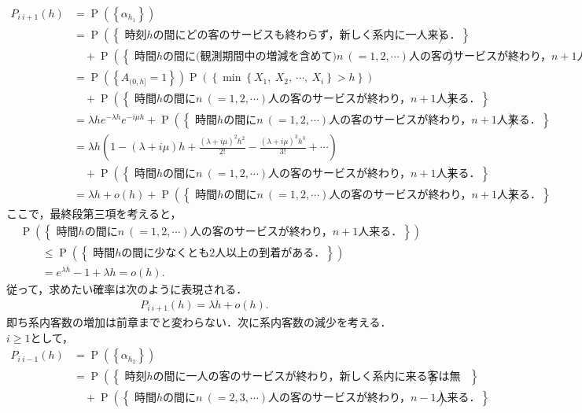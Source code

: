 \documentclass[a4j,papersize,disablejfam,slide,14pt]{jsarticle}
\def\min#1#2{\operatorname{min} \left\{ #1,\ #2 \right\}} %
\def\exp#1{e^{#1}} %
\def\prob#1{\operatorname{P} \left(\left\{ #1 \right\}\right)} %
\begin{document}
    \begin{align}
    	P_{i\ i+1}(h) &= \prob{\alpha_h_1} \\
        	&= \prob{\mbox{ 時刻$h$の間にどの客のサービスも終わらず，新しく系内に一人来る．}} \\
            &\quad+ \prob{\mbox{ 時間$h$の間に(観測期間中の増減を含めて)$n\ (=1,2,\cdots)$人の客のサービスが終わり，$n+1$人来る．}} \\
            &= \prob{A_{(0,h]} = 1} \prob{\min{X_1,\ X_2,\ \cdots}{X_i} > h} \\
            &\quad+ \prob{\mbox{ 時間$h$の間に$n\ (=1,2,\cdots)$人の客のサービスが終わり，$n+1$人来る．}} \\
            &= \lambda h \exp{-\lambda h} \exp{-i \mu h} + \prob{\mbox{ 時間$h$の間に$n\ (=1,2,\cdots)$人の客のサービスが終わり，$n+1$人来る．}} \\
            &= \lambda h \left( 1 - (\lambda+i\mu)h + \frac{(\lambda+i\mu)^2h^2}{2!} - \frac{(\lambda+i\mu)^3h^3}{3!} + \cdots \right) \\
            &\quad+ \prob{\mbox{ 時間$h$の間に$n\ (=1,2,\cdots)$人の客のサービスが終わり，$n+1$人来る．}} \\
            &= \lambda h + o(h) + \prob{\mbox{ 時間$h$の間に$n\ (=1,2,\cdots)$人の客のサービスが終わり，$n+1$人来る．}}.
    \end{align}
    ここで，最終段第三項を考えると，
    \begin{align}
    		&\prob{\mbox{ 時間$h$の間に$n\ (=1,2,\cdots)$人の客のサービスが終わり，$n+1$人来る．}} \\
            &\qquad\leq \prob{\mbox{ 時間$h$の間に少なくとも$2$人以上の到着がある．}} \\
        	&\qquad= \exp{\lambda h} - 1 + \lambda h = o(h). 
    \end{align}
    従って，求めたい確率は次のように表現される．
    \begin{align}
        P_{i\ i+1}(h) = \lambda h + o(h).
    \end{align}
    即ち系内客数の増加は前章までと変わらない．次に系内客数の減少を考える．$i \geq 1$として，
    \begin{align}
    	P_{i\ i-1}(h) &= \prob{\alpha_h_2} \\
        	&= \prob{\mbox{ 時刻$h$の間に一人の客のサービスが終わり，新しく系内に来る客は無い．}} \\
            &\quad+ \prob{\mbox{ 時間$h$の間に$n\ (=2,3,\cdots)$人の客のサービスが終わり，$n-1$人来る．}} & \label{eq:mid1}
    \end{align}
\end{document}

